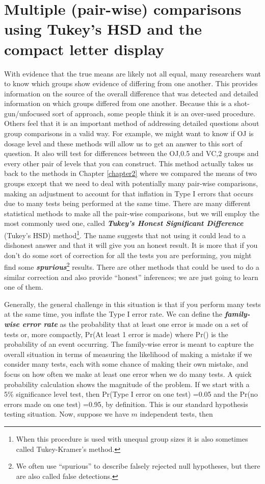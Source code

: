 \documentclass[]{book}
\let\rmarkdownfootnote\footnote%
\def\footnote{\protect\rmarkdownfootnote}
\theoremstyle{definition}
\theoremstyle{definition}
\theoremstyle{remark}
\begin{document}
\section{Multiple (pair-wise) comparisons using Tukey's HSD and the
compact letter display}\label{section3-6}

With evidence that the true means are likely not all equal, many
researchers want to know which groups show evidence of differing from
one another. This provides information on the source of the overall
difference that was detected and detailed information on which groups
differed from one another. Because this is a shot-gun/unfocused sort of
approach, some people think it is an over-used procedure. Others feel
that it is an important method of addressing detailed questions about
group comparisons in a valid way. For example, we might want to know if
OJ is dosage level and these methods will allow us to get an answer to
this sort of question. It also will test for differences between the
OJ,0.5 and VC,2 groups and every other pair of levels that you can
construct. This method actually takes us back to the methods in Chapter
\ref{chapter2} where we compared the means of two groups except that we
need to deal with potentially many pair-wise comparisons, making an
adjustment to account for that inflation in Type I errors that occurs
due to many tests being performed at the same time. There are many
different statistical methods to make all the pair-wise comparisons, but
we will employ the most commonly used one, called \textbf{\emph{Tukey's
Honest Significant Difference}} (Tukey's HSD) method\footnote{When this
  procedure is used with unequal group sizes it is also sometimes called
  Tukey-Kramer's method.}. The name suggests that not using it could
lead to a dishonest answer and that it will give you an honest result.
It is more that if you don't do some sort of correction for all the
tests you are performing, you might find some
\textbf{\emph{spurious}}\footnote{We often use ``spurious'' to describe
  falsely rejected null hypotheses, but there are also called false
  detections.} results. There are other methods that could be used to do
a similar correction and also provide ``honest'' inferences; we are just
going to learn one of them.

Generally, the general challenge in this situation is that if you
perform many tests at the same time, you inflate the Type I error rate.
We can define the \textbf{\emph{family-wise error rate}} as the
probability that at least one error is made on a set of tests or, more
compactly, Pr(At least 1 error is made) where Pr() is the probability of
an event occurring. The family-wise error is meant to capture the
overall situation in terms of measuring the likelihood of making a
mistake if we consider many tests, each with some chance of making their
own mistake, and focus on how often we make at least one error when we
do many tests. A quick probability calculation shows the magnitude of
the problem. If we start with a 5\% significance level test, then
Pr(Type I error on one test) =0.05 and the Pr(no errors made on one
test) =0.95, by definition. This is our standard hypothesis testing
situation. Now, suppose we have \(m\) independent tests, then
\end{document}
